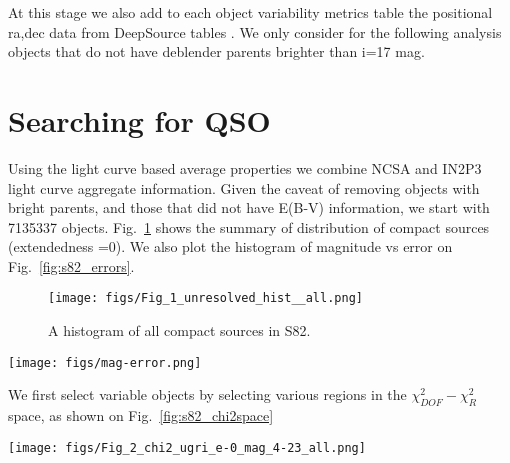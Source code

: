 \documentclass[fleqn,usenatbib]{mnras}  %
\begin{document}
At this stage we also add to each object variability metrics table the positional ra,dec data from DeepSource tables . We only consider for the following analysis objects that do not have deblender parents brighter than i=17 mag. 


\section{Searching for QSO}

Using the light curve based average properties we combine NCSA and IN2P3 light curve aggregate information. Given the caveat of removing objects with bright parents, and those that did not have E(B-V) information, we start with 7135337 objects. Fig.~\ref{fig:s82_histogram} shows the summary of distribution of compact sources (extendedness =0). We also plot the histogram of magnitude vs error on Fig.~\ref{fig:s82_errors}.


\begin{figure}
 \texttt{[image: figs/Fig\_1\_unresolved\_hist\_\_all.png]}
 \caption{A histogram of all compact sources in S82.}
 \label{fig:s82_histogram}
\end{figure}

\begin{figure*}
\texttt{[image: figs/mag-error.png]}
\caption{Mean-based magnitudes vs errors for S82 objects with extendedness=0 (top), and extendedness=1 (bottom). From left to right, data in u,g,r,i,z filters. The color scale corresponds to $\log_{10}(\mathrm{counts})$. The fainter the object, the higher the mean error (psfMeanErr is based on psfMeanFluxErr, which is the error on the weighted mean of fluxes). }
\label{fig:s82_errors}
\end{figure*}


We first select variable objects by selecting various regions in the $\chi^{2}_{DOF}-\chi^{2}_{R}$ space, as shown on Fig.~\ref{fig:s82_chi2space}

\begin{figure*}
 \texttt{[image: figs/Fig\_2\_chi2\_ugri\_e-0\_mag\_4-23\_all.png]}
 \caption{$\chi^{2}_{DOF}-\chi^{2}_{R}$ space calculated for data in u,g,r,i  filters. Region S1 includes highly variable objects, S2a a transitional region, and S2b a region with possible variable candidates. We select variable candidates from S1 region, based on the g-band $\chi^{2}$. }
 \label{fig:s82_chi2space}
\end{figure*}
\end{document}
